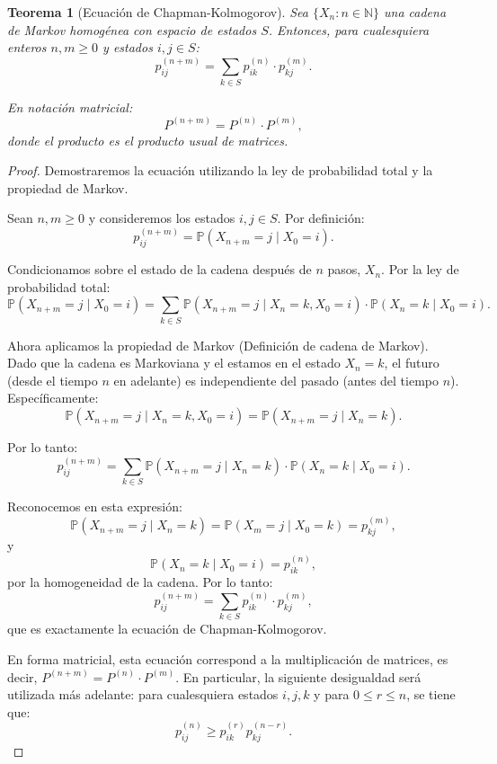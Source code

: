 \documentclass[12pt]{book}
\newtheorem{theorem}{Teorema}[chapter]
\begin{document}
\begin{theorem}[Ecuación de Chapman-Kolmogorov]
Sea $\{X_n : n \in \mathbb{N}\}$ una cadena de Markov homogénea con espacio de estados $S$. Entonces, para cualesquiera enteros $n, m \geq 0$ y estados $i, j \in S$:
\[
p_{ij}^{(n+m)} = \sum_{k \in S} p_{ik}^{(n)} \cdot p_{kj}^{(m)}.
\]

En notación matricial:
\[
P^{(n+m)} = P^{(n)} \cdot P^{(m)},
\]
donde el producto es el producto usual de matrices.
\end{theorem}

\begin{proof}
Demostraremos la ecuación utilizando la ley de probabilidad total y la propiedad de Markov.

Sean $n, m \geq 0$ y consideremos los estados $i, j \in S$. Por definición:
\[
p_{ij}^{(n+m)} = \mathbb{P}(X_{n+m} = j \mid X_0 = i).
\]

Condicionamos sobre el estado de la cadena después de $n$ pasos, $X_n$. Por la ley de probabilidad total:
\[
\mathbb{P}(X_{n+m} = j \mid X_0 = i) = \sum_{k \in S} \mathbb{P}(X_{n+m} = j \mid X_n = k, X_0 = i) \cdot \mathbb{P}(X_n = k \mid X_0 = i).
\]

Ahora aplicamos la propiedad de Markov (Definición de cadena de Markov). Dado que la cadena es Markoviana y el estamos en el estado $X_n = k$, el futuro (desde el tiempo $n$ en adelante) es independiente del pasado (antes del tiempo $n$). Específicamente:
\[
\mathbb{P}(X_{n+m} = j \mid X_n = k, X_0 = i) = \mathbb{P}(X_{n+m} = j \mid X_n = k).
\]

Por lo tanto:
\[
p_{ij}^{(n+m)} = \sum_{k \in S} \mathbb{P}(X_{n+m} = j \mid X_n = k) \cdot \mathbb{P}(X_n = k \mid X_0 = i).
\]

Reconocemos en esta expresión:
\[
\mathbb{P}(X_{n+m} = j \mid X_n = k) = \mathbb{P}(X_{m} = j \mid X_0 = k) = p_{kj}^{(m)},
\]
y
\[
\mathbb{P}(X_n = k \mid X_0 = i) = p_{ik}^{(n)},
\]
por la homogeneidad de la cadena. Por lo tanto:
\[
p_{ij}^{(n+m)} = \sum_{k \in S} p_{ik}^{(n)} \cdot p_{kj}^{(m)},
\]
que es exactamente la ecuación de Chapman-Kolmogorov.

En forma matricial, esta ecuación correspond a la multiplicación de matrices, es decir, $P^{(n+m)} = P^{(n)} \cdot P^{(m)}$.
En particular, la siguiente desigualdad será utilizada más adelante: para cualesquiera estados $i, j, k$ y para $0 \leq r \leq n$, se tiene que:
\[
p_{ij}^{(n)} \geq  p_{ik}^{(r)} p_{kj}^{(n-r)}.
\]

\end{proof}
\end{document}
